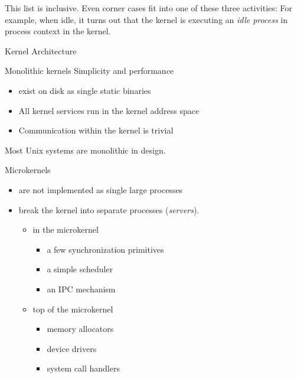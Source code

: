 This list is inclusive. Even corner cases fit into one of these three activities: For
example, when idle, it turns out that the kernel is executing an \emph{idle process} in
process context in the kernel.

\begin{frame}{Kernel Architecture}
  \begin{block}{Monolithic kernels}
    Simplicity and performance
    \begin{itemize}
    \item exist on disk as single static binaries
    \item All kernel services run in the kernel address space
    \item Communication within the kernel is trivial
    \end{itemize}
    Most Unix systems are monolithic in design.
  \end{block}
\end{frame}

\begin{frame}
  \begin{block}{Microkernels}
    \begin{itemize}
    \item are not implemented as single large processes
    \item break the kernel into separate processes (\emph{servers}).
      \begin{multicols}{2}
        \begin{itemize}
        \item in the microkernel
          \begin{itemize}
          \item a few synchronization primitives
          \item a simple scheduler
          \item an IPC mechanism
          \end{itemize}
        \item top of the microkernel
          \begin{itemize}
          \item memory allocators
          \item device drivers
          \item system call handlers
          \end{itemize}
        \end{itemize}
      \end{multicols}
    \end{itemize}
  \end{block}
\end{frame}

